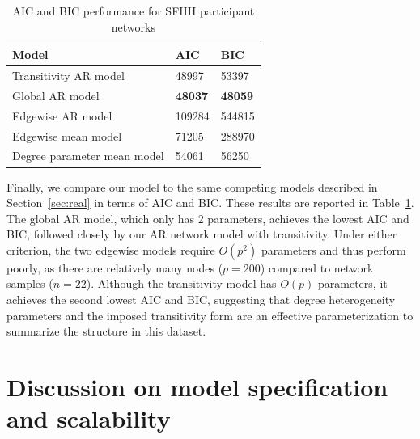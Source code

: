 \documentclass[12pt]{article}
\newcommand{\0}{{\bf 0}}
\begin{document}
\begin{table}[]
\begin{center}
\begin{tabular}{|l|l|l|}
\hline
\textbf{Model}              & \textbf{AIC}   & \textbf{BIC}   \\ \hline
Transitivity AR model       & 48997 & 53397          \\ \hline
Global AR model             & \textbf{48037}          & \textbf{48059} \\ \hline
Edgewise AR model           & 109284         & 544815         \\ \hline
Edgewise mean model         & 71205          & 288970         \\ \hline
Degree parameter mean model & 54061          & 56250          \\ \hline
\end{tabular}
\end{center}
\caption{\label{tab:aic_sfhh}{AIC and BIC performance for SFHH participant networks}}
\end{table}

Finally, we compare our model to the same competing models described in Section~\ref{sec:real} in terms of AIC and BIC. These results are reported in Table~\ref{tab:aic_sfhh}. The global AR model, which only has 2 parameters, achieves the lowest AIC and BIC, followed closely by our AR network model with transitivity. 
Under either criterion, the two edgewise models require $O(p^2)$ parameters and thus perform poorly, as there are relatively many nodes ($p=200$) compared to network samples ($n=22$).
Although the transitivity model has $O(p)$ parameters, it achieves the second lowest AIC and BIC,  suggesting that degree heterogeneity parameters and the imposed transitivity form are an effective parameterization to summarize the structure in this dataset.



\section{Discussion on model specification and scalability}
\label{app:add.discussion}
\end{document}
